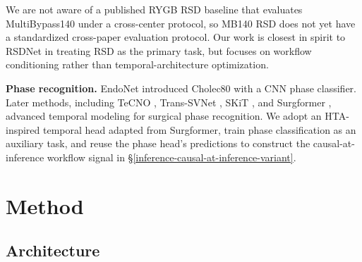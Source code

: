 We are not aware of a published RYGB RSD baseline that evaluates
MultiBypass140 under a cross-center protocol, so MB140 RSD does not
yet have a standardized cross-paper evaluation protocol. Our work is
closest in spirit to RSDNet in treating RSD as the primary task, but
focuses on workflow conditioning rather than temporal-architecture
optimization.

\textbf{Phase recognition.} EndoNet \citep{twinanda2017endonet}
introduced Cholec80 with a CNN phase classifier. Later methods,
including TeCNO \citep{czempiel2020tecno}, Trans-SVNet
\citep{gao2021transsvnet}, SKiT \citep{liu2023skit}, and Surgformer
\citep{yang2024surgformer}, advanced temporal modeling for surgical
phase recognition. We adopt an HTA-inspired temporal head adapted from
Surgformer, train phase classification as an auxiliary task, and reuse
the phase head's predictions to construct the causal-at-inference
workflow signal in \S\ref{inference-causal-at-inference-variant}.


\section{Method}\label{method}

\subsection{Architecture}\label{architecture}

